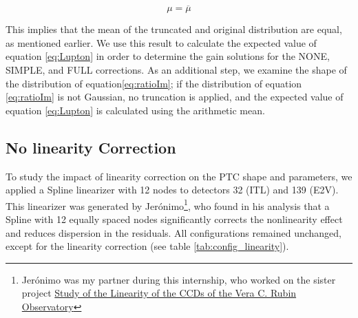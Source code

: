 \begin{itemize}
    \begin{equation}
        \mu = \overline{\mu}
        \label{eq:truncated_dist_simetric}
    \end{equation}

    This implies that the mean of the truncated and original distribution are equal, as mentioned earlier. We use this result to calculate the expected value of equation \ref{eq:Lupton} in order to determine the gain solutions for the NONE, SIMPLE, and FULL corrections. As an additional step, we examine the shape of the distribution of equation\ref{eq:ratioIm}; if the distribution of equation \ref{eq:ratioIm} is not Gaussian, no truncation is applied, and the expected value of equation \ref{eq:Lupton} is calculated using the arithmetic mean.

\end{itemize}


\subsection{No linearity Correction} \label{subsec:method_Linearity}

To study the impact of linearity correction on the PTC shape and parameters, we applied a Spline linearizer with 12 nodes to detectors 32 (ITL) and 139 (E2V). This linearizer was generated by Jerónimo\footnote{Jerónimo was my partner during this internship, who worked on the sister project \href{https://github.com/jerocalderong/LinearityRubinObservatoryCCDs/blob/main/Linearity_of_the_Vera_Rubin_Observatory_CCDs_Prelim.pdf}{Study of the Linearity of the CCDs of the Vera C. Rubin Observatory}}, who found in his analysis that a Spline with 12 equally spaced nodes significantly corrects the nonlinearity effect and reduces dispersion in the residuals. All configurations remained unchanged, except for the linearity correction (see table \ref{tab:config_linearity}).


\begin{table}[!htb]
\centering
\caption{The configuration used to generate the PTCs when we include the linearity correction (the parameter 'doLinearize' is set to 'true').}
\label{tab:config_linearity}
\end{table}

